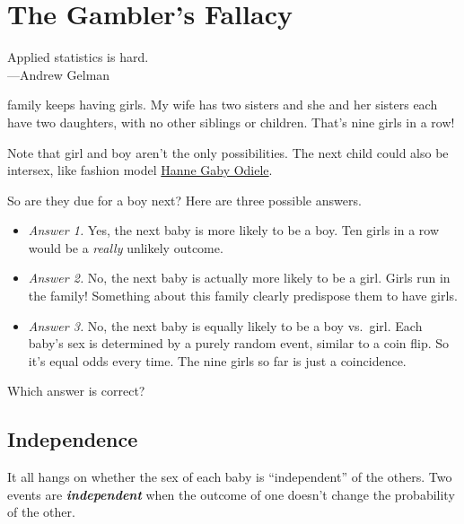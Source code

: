 \documentclass[justified]{tufte-book}
\providecommand{\tightlist}{%
  \setlength{\itemsep}{0pt}\setlength{\parskip}{0pt}}
\newenvironment{epigraph}%
{
\begin{flushright}    
\begin{minipage}{20em}
\begin{flushright}
\itshape
}%
{
\end{flushright}
\end{minipage}
\end{flushright}
}
\theoremstyle{definition}
\theoremstyle{definition}
\theoremstyle{definition}
\theoremstyle{definition}
\theoremstyle{remark}
\begin{document}
\hypertarget{the-gamblers-fallacy}{%
\chapter{The Gambler's Fallacy}\label{the-gamblers-fallacy}}

\begin{epigraph}
Applied statistics is hard.\\
---Andrew Gelman
\end{epigraph}

 family keeps having girls. My wife has two sisters and she and her sisters each have two daughters, with no other siblings or children. That's nine girls in a row!

\begin{marginfigure}
Note that girl and boy aren't the only possibilities. The next child
could also be intersex, like fashion model
\href{https://en.wikipedia.org/wiki/Hanne_Gaby_Odiele}{Hanne Gaby
Odiele}.
\end{marginfigure}

So are they due for a boy next? Here are three possible answers.

\begin{itemize}
\tightlist
\item
  \emph{Answer 1.} Yes, the next baby is more likely to be a boy. Ten girls in a row would be a \emph{really} unlikely outcome.
\item
  \emph{Answer 2.} No, the next baby is actually more likely to be a girl. Girls run in the family! Something about this family clearly predispose them to have girls.
\item
  \emph{Answer 3.} No, the next baby is equally likely to be a boy vs.~girl. Each baby's sex is determined by a purely random event, similar to a coin flip. So it's equal odds every time. The nine girls so far is just a coincidence.
\end{itemize}

Which answer is correct?

\hypertarget{independence}{%
\section{Independence}\label{independence}}

It all hangs on whether the sex of each baby is ``independent'' of the others. Two events are \textbf{\emph{independent}} when the outcome of one doesn't change the probability of the other.
\end{document}

